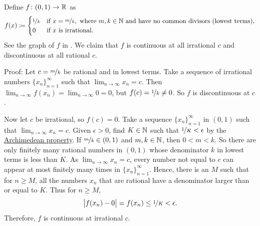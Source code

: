 \begin{example} \label{popcornfunction:example}
Define $f \colon (0,1) \to {\mathbb{R}}$ as
\begin{equation*}
f(x) \coloneqq 
\begin{cases}
\nicefrac{1}{k} & \text{if } x=\nicefrac{m}{k}, \text{ where } m,k \in {\mathbb{N}}
\text{ and have no common divisors (lowest terms),} \\
0 & \text{if } x \text{ is irrational.}
\end{cases}
\end{equation*}
See the graph of $f$
in .
We claim that
$f$ is continuous at all irrational $c$ and 
discontinuous at all rational $c$.
\begin{myfigureht}
\caption{Graph of the \label{popcornfig}}
\end{myfigureht}

Proof:
Let $c = \nicefrac{m}{k}$ be rational and in lowest terms.  Take a sequence of
irrational numbers $\{ x_n \}_{n=1}^\infty$ such that $\lim_{n\to\infty} x_n = c$.  Then
$\lim_{n\to\infty} f(x_n) = \lim_{n\to\infty} 0 = 0$, but $f(c) = \nicefrac{1}{k} \neq 0$.  So $f$
is discontinuous at $c$.

Now let $c$ be irrational, so $f(c) = 0$.  Take a sequence 
$\{ x_n \}_{n=1}^\infty$ in $(0,1)$ such that $\lim_{n\to\infty} x_n = c$.
Given $\epsilon > 0$, find $K \in {\mathbb{N}}$ such
that $\nicefrac{1}{K} < \epsilon$
by the \hyperref[thm:arch:i]{Archimedean property}.
If $\nicefrac{m}{k} \in (0,1)$ and $m,k \in {\mathbb{N}}$, then $0 < m < k$.
So there are only finitely many rational numbers in $(0,1)$
whose denominator $k$ in lowest terms is less than $K$.
As $\lim_{n\to\infty} x_n = c$, every number not equal to $c$ can appear at most
finitely many times in $\{ x_n \}_{n=1}^\infty$.
Hence,
there is an $M$ such that for $n \geq M$, all the numbers $x_n$
that are rational
have a denominator larger than or equal to $K$.  Thus for $n \geq M$,
\begin{equation*}
\bigl\lvert {f(x_n) - 0} \bigr\rvert = f(x_n) \leq \nicefrac{1}{K} < \epsilon .
\end{equation*}
Therefore, $f$ is continuous at irrational $c$.
\end{example}

